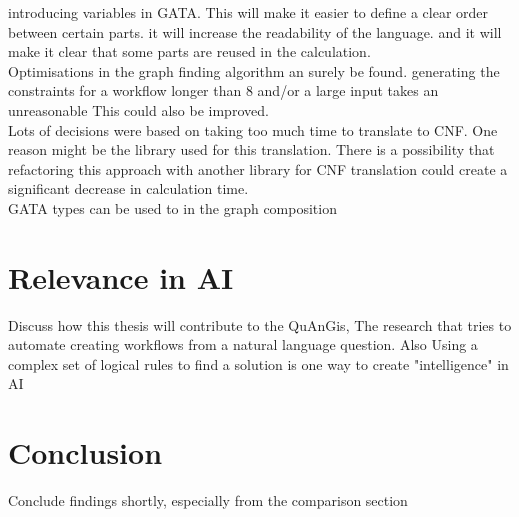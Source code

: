 \documentclass{article}
\begin{document}
introducing variables in GATA. This will make it easier to define a clear order between certain parts. it will increase the readability of the language. and it will make it clear that some parts are reused in the calculation. 
\\

 Optimisations in the graph finding algorithm an surely be found. 
 generating the constraints for a workflow longer than 8 and/or a large input takes an unreasonable This could also be improved. \\

Lots of decisions were based on taking too much time to translate to CNF. One reason might be the library used for this translation. There is a possibility that refactoring this approach with another library for CNF translation could create a significant decrease in calculation time.\\

GATA types can be used to in the graph composition

\section{Relevance in AI}

Discuss how this thesis will contribute to the QuAnGis, The research that tries to automate creating workflows from a natural language question. 
Also Using a complex set of logical rules to find a solution is one way to create "intelligence" in AI 



\section{Conclusion}
 Conclude findings shortly, especially from the comparison section




\end{document}
